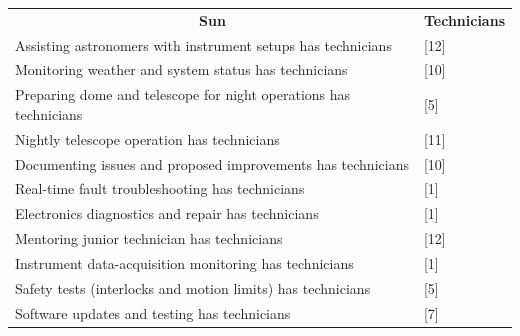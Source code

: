 \documentclass{article}
\begin{document}
\begin{table}[!ht]
\begin{tabular}{ll}
\multicolumn{1}{c}{\textbf{Sun}}                                  & \multicolumn{1}{c}{\textbf{Technicians}} \\
Assisting astronomers with instrument setups has technicians      & {[}12{]}                                 \\
Monitoring weather and system status has technicians              & {[}10{]}                                 \\
Preparing dome and telescope for night operations has technicians & {[}5{]}                                  \\
Nightly telescope operation has technicians                       & {[}11{]}                                 \\
Documenting issues and proposed improvements has technicians      & {[}10{]}                                 \\
Real-time fault troubleshooting has technicians                   & {[}1{]}                                  \\
Electronics diagnostics and repair has technicians                & {[}1{]}                                  \\
Mentoring junior technician has technicians                            & {[}12{]}                                 \\
Instrument data-acquisition monitoring has technicians            & {[}1{]}                                  \\
Safety tests (interlocks and motion limits) has technicians       & {[}5{]}                                  \\
Software updates and testing has technicians                      & {[}7{]}                                  \\                                      
\end{tabular}
\end{table}
\end{document}
